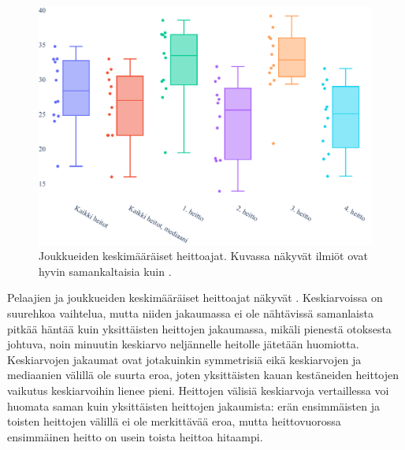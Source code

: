     \begin{figure}[!ht]
        \centering
        \includegraphics[width=\textwidth]{figures/keskiarvot2.pdf}
        \caption{
            Joukkueiden keskimääräiset heittoajat.
            Kuvassa näkyvät ilmiöt ovat hyvin samankaltaisia kuin .\label{fig:teams}
        }
    \end{figure}

    Pelaajien ja joukkueiden keskimääräiset heittoajat näkyvät  .
    Keskiarvoissa on suurehkoa vaihtelua,
    mutta niiden jakaumassa ei ole nähtävissä samanlaista pitkää häntää kuin yksittäisten heittojen jakaumassa,
    mikäli pienestä otoksesta johtuva, noin minuutin keskiarvo neljännelle heitolle jätetään huomiotta.
    Keskiarvojen jakaumat ovat jotakuinkin symmetrisiä eikä keskiarvojen ja mediaanien välillä ole suurta eroa,
    joten yksittäisten kauan kestäneiden heittojen vaikutus keskiarvoihin lienee pieni.
    Heittojen välisiä keskiarvoja vertaillessa voi huomata saman kuin yksittäisten heittojen jakaumista:
    erän ensimmäisten ja toisten heittojen välillä ei ole merkittävää eroa,
    mutta heittovuorossa ensimmäinen heitto on usein toista heittoa hitaampi.  

